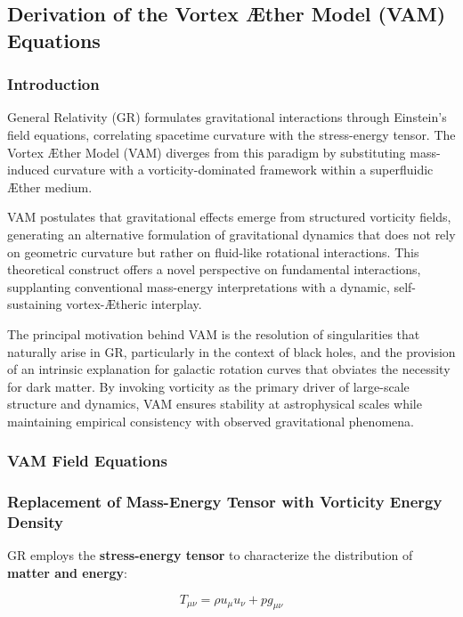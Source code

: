 \subsection{Derivation of the Vortex Æther Model (VAM) Equations}

\subsubsection*{Introduction}
General Relativity (GR) formulates gravitational interactions through Einstein's field equations, correlating spacetime curvature with the stress-energy tensor. The Vortex Æther Model (VAM) diverges from this paradigm by substituting mass-induced curvature with a vorticity-dominated framework within a superfluidic Æther medium.

VAM postulates that gravitational effects emerge from structured vorticity fields, generating an alternative formulation of gravitational dynamics that does not rely on geometric curvature but rather on fluid-like rotational interactions. This theoretical construct offers a novel perspective on fundamental interactions, supplanting conventional mass-energy interpretations with a dynamic, self-sustaining vortex-Ætheric interplay.

The principal motivation behind VAM is the resolution of singularities that naturally arise in GR, particularly in the context of black holes, and the provision of an intrinsic explanation for galactic rotation curves that obviates the necessity for dark matter. By invoking vorticity as the primary driver of large-scale structure and dynamics, VAM ensures stability at astrophysical scales while maintaining empirical consistency with observed gravitational phenomena.

\subsubsection*{VAM Field Equations}


\subsubsection*{Replacement of Mass-Energy Tensor with Vorticity Energy Density}
GR employs the \textbf{stress-energy tensor} to characterize the distribution of \textbf{matter and energy}:

\begin{equation*}
    T_{\mu\nu} = \rho u_\mu u_\nu + p g_{\mu\nu}
\end{equation*}

